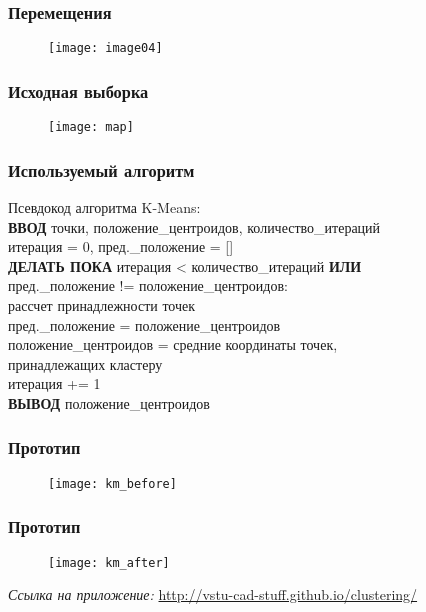 \begin{frame}
    \frametitle{Перемещения}
    \begin{figure}
        \center
        \texttt{[image: image04]}
    \end{figure}
\end{frame}

\begin{frame}
    \frametitle{Исходная выборка}
    \begin{figure}
        \center
        \texttt{[image: map]}
    \end{figure}
\end{frame}

\begin{frame}
    \frametitle{Используемый алгоритм}
    Псевдокод алгоритма K-Means:\\
    \vspace{1em}
    \footnotesize
    \textbf{ВВОД} точки, положение\_центроидов, количество\_итераций\\
    итерация = 0, пред.\_положение = []\\
    \textbf{ДЕЛАТЬ ПОКА} итерация < количество\_итераций
    \textbf{ИЛИ} \\ \hspace{.15cm} пред.\_положение != положение\_центроидов:\\
    \hspace{.5cm} рассчет принадлежности точек\\
    \hspace{.5cm} пред.\_положение = положение\_центроидов\\
    \hspace{.5cm} положение\_центроидов = средние координаты точек,\\
    \hspace{4.8cm}принадлежащих кластеру\\
    \hspace{.5cm} итерация += 1\\
    \textbf{ВЫВОД} положение\_центроидов
\end{frame}

\begin{frame}
    \frametitle{Прототип}
    \begin{figure}
        \center
        \texttt{[image: km\_before]}
    \end{figure}
\end{frame}

\begin{frame}
    \frametitle{Прототип}
    \begin{figure}
        \center
        \texttt{[image: km\_after]}
    \end{figure}
    \small\emph{Ссылка на приложение:} \url{http://vstu-cad-stuff.github.io/clustering/}
\end{frame}

